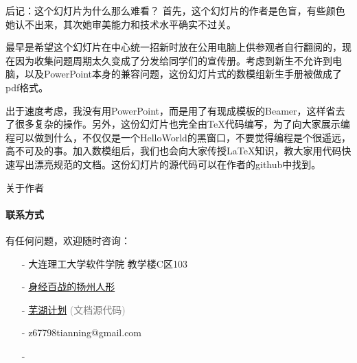 \documentclass{beamer}
\begin{document}
\begin{frame}{后记：这个幻灯片为什么那么难看？}
	首先，这个幻灯片的作者是色盲，有些颜色她认不出来，其次她审美能力和技术水平确实不过关。
	
	\vspace{0.5cm}
	最早是希望这个幻灯片在中心统一招新时放在公用电脑上供参观者自行翻阅的，现在因为收集问题周期太久变成了分发给同学们的宣传册。考虑到新生不允许到电脑，以及PowerPoint本身的兼容问题，这份幻灯片式的数模组新生手册被做成了pdf格式。
	
	\vspace{0.5cm}
	出于速度考虑，我没有用PowerPoint，而是用了有现成模板的Beamer，这样省去了很多复杂的操作。另外，这份幻灯片也完全由\TeX 代码编写，为了向大家展示编程可以做到什么，不仅仅是一个HelloWorld的黑窗口，不要觉得编程是个很遥远，高不可及的事。加入数模组后，我们也会向大家传授\LaTeX 知识，教大家用代码快速写出漂亮规范的文档。这份幻灯片的源代码可以在作者的github中找到。
\end{frame}

\begin{frame}{关于作者}
	\framesubtitle{联系方式}
	有任何问题，欢迎随时咨询：
	\begin{itemize}
		\item[-] \faInstitution 大连理工大学软件学院 \faMapMarker 教学楼C区103
		\item[-] \faWeibo{}  \faAt\href{http://weibo.com/301yangzhou}{身经百战的扬州人形}
		\item[-] \faGithub{} \href{https://github.com/Lixinyi-DUT/Project-Wuhu}{芜湖计划} \textcolor{gray}{(文档源代码)}
		\item[-] \faEnvelopeO{} z67798tianning@gmail.com
		\item[-] 
	\end{itemize}
\end{frame}
\end{document}
